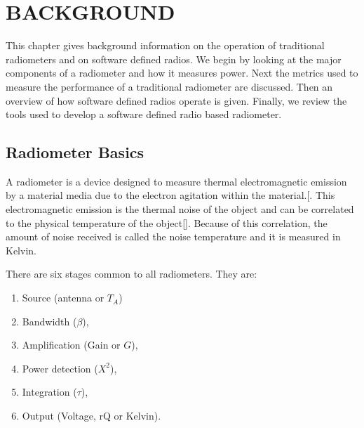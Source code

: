 

\chapter{BACKGROUND}\label{ch:background}
This chapter gives background information on the operation of  traditional radiometers and on software defined radios.  We begin by looking at the major components of a radiometer and how it measures power.  Next the metrics used to measure the performance of a traditional radiometer are discussed.  Then an overview of how software defined radios operate is given.  Finally, we review the tools used to develop a software defined radio based radiometer.  


\section{Radiometer Basics}\label{rad_basics}
A radiometer is a device designed to measure thermal electromagnetic emission by a material media due to the electron agitation within the material.[\cite{ulaby}.  This electromagnetic emission is the thermal noise of the object and can be correlated to the physical temperature of the object[\cite{Nyquist1928thermal}].  Because of this correlation, the amount of noise received is called the noise temperature and it is measured in Kelvin. 

There are six stages common to all radiometers.  They are:

\begin{enumerate}
\item Source (antenna or $T_{A}$)
\item Bandwidth ($\beta$),
\item Amplification (Gain or $G$),
\item Power detection ($X^{2}$),
\item Integration ($\tau$),
\item Output (Voltage, rQ or Kelvin).
\end{enumerate}

